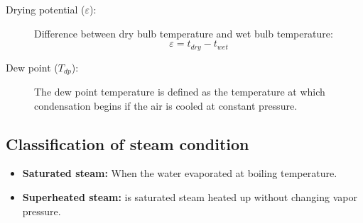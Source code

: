 \begin{description}
    \item[Drying potential ($\varepsilon$):] Difference between dry bulb temperature and wet bulb temperature:
    \begin{equation*}
        \varepsilon = t_{dry} - t_{wet}
    \end{equation*}

    \item[Dew point ($T_{dp}$):] The dew point temperature is defined as the temperature at which condensation begins if the air is cooled at constant pressure.
\end{description}

\subsection{Classification of steam condition}
\begin{itemize}
    \item \textbf{Saturated steam:} When the water evaporated at boiling temperature.
    \item \textbf{Superheated steam:} is saturated steam heated up without changing vapor pressure.
\end{itemize}
